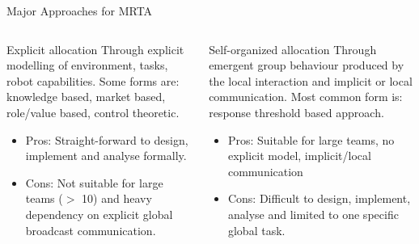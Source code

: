 \documentclass{beamer}
\begin{document}
\begin{frame}[t]{Major Approaches for MRTA}
 \begin{columns}
\begin{block}{Explicit allocation}
Through \alert{explicit modelling} of environment, tasks, robot capabilities. Some forms are: knowledge based, market based, role/value based, control theoretic. 
\begin{itemize}
\item \small Pros: Straight-forward to design, implement and analyse formally. %
\item \small Cons: \alert{Not suitable for large teams ($>$ 10) and heavy dependency on explicit global broadcast communication.}
\end{itemize}
\end{block}
\begin{block}{Self-organized allocation}
Through \alert{emergent group behaviour} produced by the local interaction and implicit or local communication. Most common form is: response threshold based approach.
\begin{itemize}
\item \small Pros: Suitable for large teams, no explicit model, implicit/local communication
\item \small Cons: \alert{Difficult to design, implement, analyse and limited to one specific global task.} %
\end{itemize}
\end{block}
\end{columns}
\end{frame}
\end{document}
